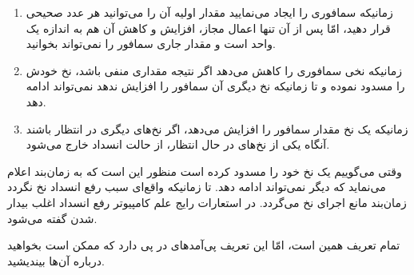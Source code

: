 \documentclass{book}
\begin{document}
\begin{enumerate}

\item 
    زمانیکه سمافوری را ایجاد می‌نمایید مقدار اولیه آن را می‌توانید هر عدد صحیحی قرار دهید، امّا پس از آن تنها اعمال مجاز، افزایش و کاهش آن هم 
    به اندازه یک واحد است و مقدار جاری سمافور را نمی‌تواند بخوانید. 

\item 
    زمانیکه نخی سمافوری را کاهش می‌دهد اگر نتیجه  مقداری منفی باشد، نخ خودش را مسدود نموده 
    و تا زمانیکه نخ دیگری آن سمافور را افزایش ندهد نمی‌تواند ادامه دهد. 
\item 
    زمانیکه یک نخ مقدار سمافور را افزایش می‌دهد، اگر نخ‌های دیگری در انتظار باشند آنگاه یکی از نخ‌های در حال انتظار،‌ از حالت انسداد خارج می‌شود. 

\end{enumerate}

    وقتی می‌گوییم یک نخ خود را مسدود کرده است %
    منظور این است که به زمان‌بند اعلام می‌نماید که دیگر نمی‌تواند ادامه دهد. 
    تا زمانیکه واقع‌ای سبب رفع انسداد نخ نگردد زمان‌بند مانع اجرای نخ می‌گردد. 
    در استعارات رایج علم کامپیوتر رفع انسداد اغلب بیدار شدن گفته می‌شود.

    تمام تعریف همین است،‌  
    امّا این تعریف پی‌آمدهای در پی دارد که ممکن است بخواهید درباره آن‌ها بیندیشید. 
\end{document}
